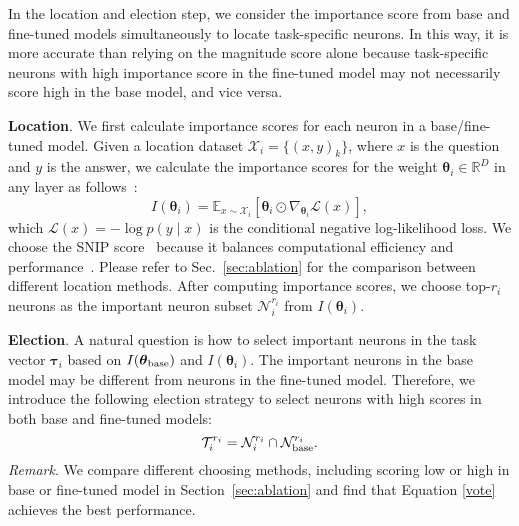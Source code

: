 In the location and election step, we consider the importance score from base and fine-tuned models simultaneously to locate task-specific neurons. In this way, it is more accurate than relying on the magnitude score alone because task-specific neurons with high importance score in the fine-tuned model may not necessarily score high in the base model, and vice versa.

{\textbf{Location}}.  We first calculate importance scores for each neuron in a base/fine-tuned model. Given a location dataset $\mathcal{X}_i=\{(x,y)_k\}$, where $x$ is the question and $y$ is the answer, we calculate the importance scores for the weight $\boldsymbol{\theta}_i\in\mathbb{R}^D$ in any  layer as follows~\cite{snip,spareseGPT,sun2024a}:
\begin{equation}
    I(\boldsymbol{\theta}_i)=\mathbb{E}_{x\sim \mathcal{X}_i}[\boldsymbol{\theta}_i\odot \nabla _{\boldsymbol{\theta}_i}\mathcal{L}(x)],
    \label{location}
\end{equation}
which $\mathcal{L}(x)=-\log p(y\mid x)$ is the conditional negative log-likelihood loss. We choose the SNIP score~\cite{snip} because it balances computational efficiency and performance~\cite{cq}. Please refer to Sec.~\ref{sec:ablation} for the comparison between different location methods. After computing importance scores, we choose top-$r_i$ neurons as the important neuron subset $\mathcal{N}_{i}^{r_i}$ from $I(\boldsymbol{\theta}_i)$.
 

{\textbf{Election}}. A natural question is how to select important neurons in the task vector $\boldsymbol{\tau}_i$ based on $I(\boldsymbol{\theta}_{\rm{base}})$ and $I(\boldsymbol{\theta}_{i})$. The important neurons in the base model may be different from neurons in the fine-tuned model. Therefore, we introduce the following election strategy to select neurons with high scores in both base and fine-tuned models:
\begin{equation}
    \mathcal{T}_i^{r_i}=\mathcal{N}_i^{r_i}\cap \mathcal{N}_{\rm{base}}^{r_i}.
    \label{vote}
\end{equation}
\emph{Remark}. We compare different choosing methods, including scoring low or high in base or fine-tuned model in Section~\ref{sec:ablation} and find that Equation \ref{vote} achieves the best performance.





